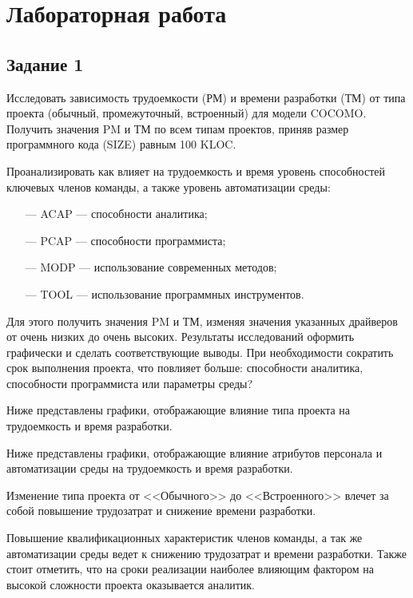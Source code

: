 \chapter{Лабораторная работа}

\section{Задание 1}

Исследовать зависимость трудоемкости (РМ) и времени разработки (ТМ) от типа проекта (обычный, промежуточный, встроенный) для модели COCOMO. Получить значения PM и ТМ по всем типам проектов, приняв размер программного кода (SIZE) равным 100 KLOC. 

Проанализировать как влияет на трудоемкость и время уровень способностей ключевых членов команды, а также уровень автоматизации среды:
\begin{itemize}
    \item[---] ACAP --- способности аналитика;
    \item[---] PCAP --- способности программиста;
    \item[---] MODP --- использование современных методов;
    \item[---] TOOL --- использование программных инструментов.
\end{itemize}

Для этого получить значения PM и ТМ, изменяя значения указанных драйверов от очень низких до очень высоких. Результаты исследований оформить графически и сделать соответствующие выводы. При необходимости сократить срок выполнения проекта, что повлияет больше: способности аналитика, способности программиста или параметры среды?

Ниже представлены графики, отображающие влияние типа проекта на трудоемкость и время разработки.


Ниже представлены графики, отображающие влияние атрибутов персонала и автоматизации среды на трудоемкость и время разработки.


Изменение типа проекта от <<Обычного>> до <<Встроенного>> влечет за собой повышение трудозатрат и снижение времени разработки.

Повышение квалификационных характеристик членов команды, а так же автоматизации среды ведет
к снижению трудозатрат и времени разработки. Также стоит отметить, что на сроки реализации наиболее влияющим фактором на высокой сложности проекта оказывается аналитик.

